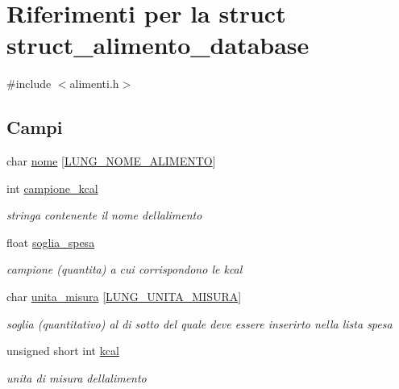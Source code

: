 \hypertarget{structstruct__alimento__database}{}\section{Riferimenti per la struct struct\+\_\+alimento\+\_\+database}
\label{structstruct__alimento__database}


{\ttfamily \#include $<$alimenti.\+h$>$}

\subsection*{Campi}
\begin{DoxyCompactItemize}
\item 
char \hyperlink{structstruct__alimento__database_a4b03791d70fe6c71278da900ad39e1b9}{nome} \mbox{[}\hyperlink{alimenti_8h_af503a16b1a63b47d6a5b2edd94b5caf2}{L\+U\+N\+G\+\_\+\+N\+O\+M\+E\+\_\+\+A\+L\+I\+M\+E\+N\+TO}\mbox{]}
\item 
int \hyperlink{structstruct__alimento__database_a156374b69f0f7e9646c8fbd2a3cbd805}{campione\+\_\+kcal}
\begin{DoxyCompactList}\small\item\em stringa contenente il nome dell\textquotesingle{}alimento \end{DoxyCompactList}\item 
float \hyperlink{structstruct__alimento__database_aee9bba41249ee895a0b32d20ebd9106b}{soglia\+\_\+spesa}
\begin{DoxyCompactList}\small\item\em campione (quantita) a cui corrispondono le kcal \end{DoxyCompactList}\item 
char \hyperlink{structstruct__alimento__database_af52c21e8f55297532c22468e8f13415b}{unita\+\_\+misura} \mbox{[}\hyperlink{alimenti_8h_ade0f1f034a3ec6c04b8e29f4730db983}{L\+U\+N\+G\+\_\+\+U\+N\+I\+T\+A\+\_\+\+M\+I\+S\+U\+RA}\mbox{]}
\begin{DoxyCompactList}\small\item\em soglia (quantitativo) al di sotto del quale deve essere inserirto nella lista spesa \end{DoxyCompactList}\item 
unsigned short int \hyperlink{structstruct__alimento__database_a5b16934bbeeeecc32cc6a0b87b2d1776}{kcal}
\begin{DoxyCompactList}\small\item\em unita di misura dell\textquotesingle{}alimento \end{DoxyCompactList}\end{DoxyCompactItemize}


